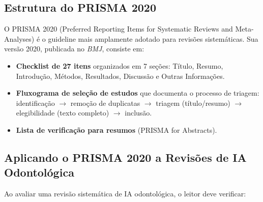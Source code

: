 \subsection{Estrutura do PRISMA 2020}

O PRISMA 2020 (Preferred Reporting Items for Systematic Reviews and Meta-Analyses)  é o guideline mais amplamente adotado para revisões sistemáticas. Sua versão 2020, publicada no \textit{BMJ}, consiste em:

\begin{itemize}
    \item \textbf{Checklist de 27 itens} organizados em 7 seções: Título, Resumo, Introdução, Métodos, Resultados, Discussão e Outras Informações.
    \item \textbf{Fluxograma de seleção de estudos} que documenta o processo de triagem: identificação $\rightarrow$ remoção de duplicatas $\rightarrow$ triagem (título/resumo) $\rightarrow$ elegibilidade (texto completo) $\rightarrow$ inclusão.
    \item \textbf{Lista de verificação para resumos} (PRISMA for Abstracts).
\end{itemize}

\subsection{Aplicando o PRISMA 2020 a Revisões de IA Odontológica}

Ao avaliar uma revisão sistemática de IA odontológica, o leitor deve verificar:

